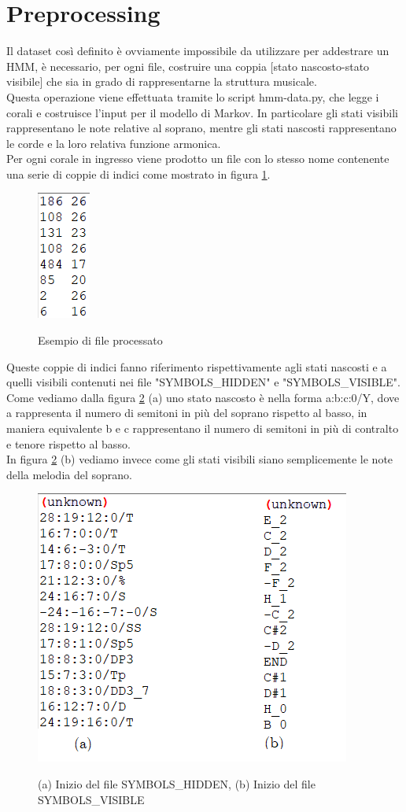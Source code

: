 \section{Preprocessing}
Il dataset così definito è ovviamente impossibile da utilizzare per addestrare un HMM, è necessario, per ogni file, costruire una coppia [stato nascosto-stato visibile] che sia in grado di rappresentarne la struttura musicale. \\
Questa operazione viene effettuata tramite lo script hmm-data.py, che legge i corali e costruisce l'input per il modello di Markov.
In particolare gli stati visibili rappresentano le note relative al soprano, mentre gli stati nascosti rappresentano le corde e la loro relativa funzione armonica. \\
Per ogni corale in ingresso viene prodotto un file con lo stesso nome contenente una serie di coppie di indici come mostrato in figura \ref{data-out}.
\begin{figure}[H]
	\centering
	\caption{Esempio di file processato}
	\includegraphics{figures/data-out.png}
	\label{data-out}
\end{figure}
\noindent
Queste coppie di indici fanno riferimento rispettivamente agli stati nascosti e a quelli visibili contenuti nei file "SYMBOLS\_HIDDEN" e "SYMBOLS\_VISIBLE".
Come vediamo dalla figura \ref{hid-vis} (a) uno stato nascosto è nella forma a:b:c:0/Y, dove a rappresenta il numero di semitoni in più del soprano rispetto al basso, in maniera equivalente b e c rappresentano il numero di semitoni in più di contralto e tenore rispetto al basso. \\
In figura \ref{hid-vis} (b) vediamo invece come gli stati visibili siano semplicemente le note della melodia del soprano.
\begin{figure}[H]
	\centering
	\caption{(a) Inizio del file SYMBOLS\_HIDDEN, (b) Inizio del file SYMBOLS\_VISIBLE}
	\includegraphics{figures/hid-vis.png}
	\label{hid-vis}
\end{figure}

